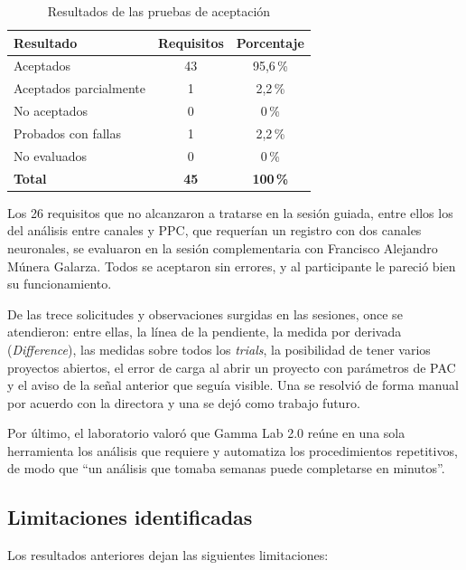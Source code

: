 \documentclass[12pt,letterpaper,oneside]{article}
\begin{document}
\begin{table}[H]
\centering
\scriptsize
\renewcommand{\arraystretch}{1.3}
\begin{tabularx}{\textwidth}{|>{\raggedright\arraybackslash}X|c|c|}
\hline
\textbf{Resultado} & \textbf{Requisitos} & \textbf{Porcentaje} \\
\hline
Aceptados & 43 & 95,6\,\% \\
\hline
Aceptados parcialmente & 1 & 2,2\,\% \\
\hline
No aceptados & 0 & 0\,\% \\
\hline
Probados con fallas & 1 & 2,2\,\% \\
\hline
No evaluados & 0 & 0\,\% \\
\hline
\textbf{Total} & \textbf{45} & \textbf{100\,\%} \\
\hline
\end{tabularx}
\caption{Resultados de las pruebas de aceptación}
\label{tab:resultados_aceptacion}
\end{table}

Los 26 requisitos que no alcanzaron a tratarse en la sesión guiada, entre ellos los del análisis entre canales y PPC, que requerían un registro con dos canales neuronales, se evaluaron en la sesión complementaria con Francisco Alejandro Múnera Galarza. Todos se aceptaron sin errores, y al participante le pareció bien su funcionamiento.

De las trece solicitudes y observaciones surgidas en las sesiones, once se atendieron: entre ellas, la línea de la pendiente, la medida por derivada (\textit{Difference}), las medidas sobre todos los \textit{trials}, la posibilidad de tener varios proyectos abiertos, el error de carga al abrir un proyecto con parámetros de PAC y el aviso de la señal anterior que seguía visible. Una se resolvió de forma manual por acuerdo con la directora y una se dejó como trabajo futuro.

Por último, el laboratorio valoró que Gamma Lab 2.0 reúne en una sola herramienta los análisis que requiere y automatiza los procedimientos repetitivos, de modo que ``un análisis que tomaba semanas puede completarse en minutos''.

\subsection{Limitaciones identificadas}
\label{sec:resultados_limitaciones}

Los resultados anteriores dejan las siguientes limitaciones:
\end{document}
